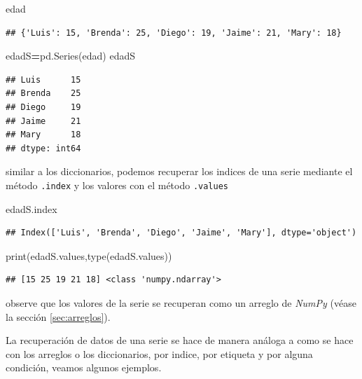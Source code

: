 \documentclass[
]{book}
\newenvironment{Shaded}{\begin{snugshade}}{\end{snugshade}}
\newcommand{\BuiltInTok}[1]{#1}
\newcommand{\NormalTok}[1]{#1}
\newcommand{\OperatorTok}[1]{\textcolor[rgb]{0.81,0.36,0.00}{\textbf{#1}}}
\theoremstyle{definition}
\theoremstyle{definition}
\theoremstyle{definition}
\theoremstyle{definition}
\theoremstyle{remark}
\begin{document}
\begin{Shaded}
\begin{Highlighting}[]
\NormalTok{edad}
\end{Highlighting}
\end{Shaded}

\begin{verbatim}
## {'Luis': 15, 'Brenda': 25, 'Diego': 19, 'Jaime': 21, 'Mary': 18}
\end{verbatim}

\begin{Shaded}
\begin{Highlighting}[]
\NormalTok{edadS}\OperatorTok{=}\NormalTok{pd.Series(edad) }
\NormalTok{edadS}
\end{Highlighting}
\end{Shaded}

\begin{verbatim}
## Luis      15
## Brenda    25
## Diego     19
## Jaime     21
## Mary      18
## dtype: int64
\end{verbatim}

similar a los diccionarios, podemos recuperar los indices de una serie mediante el método \texttt{.index} y los valores con el método \texttt{.values}

\begin{Shaded}
\begin{Highlighting}[]
\NormalTok{edadS.index}
\end{Highlighting}
\end{Shaded}

\begin{verbatim}
## Index(['Luis', 'Brenda', 'Diego', 'Jaime', 'Mary'], dtype='object')
\end{verbatim}

\begin{Shaded}
\begin{Highlighting}[]
\BuiltInTok{print}\NormalTok{(edadS.values,}\BuiltInTok{type}\NormalTok{(edadS.values))}
\end{Highlighting}
\end{Shaded}

\begin{verbatim}
## [15 25 19 21 18] <class 'numpy.ndarray'>
\end{verbatim}

observe que los valores de la serie se recuperan como un arreglo de \emph{NumPy} (véase la sección \ref{sec:arreglos}).

La recuperación de datos de una serie se hace de manera análoga a como se hace con los arreglos o los diccionarios, por indice, por etiqueta y por alguna condición, veamos algunos ejemplos.
\end{document}
